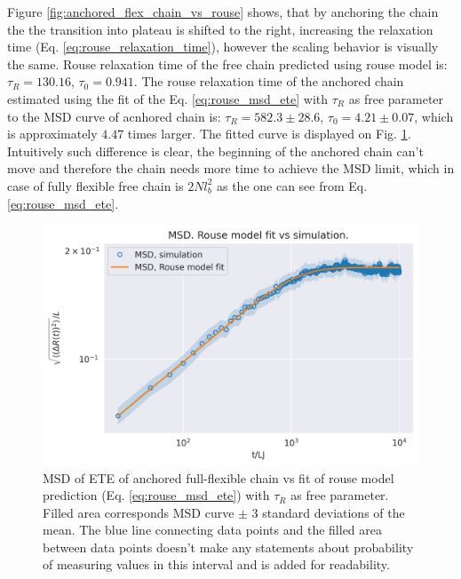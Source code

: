 \documentclass[
    paper=A4,pagesize=automedia,fontsize=12pt,
    BCOR=15mm,DIV=22,
    twoside,headinclude,footinclude=false,
    ngerman,fleqn,             %
    bibliography=totocnumbered,          %
    listof=totoc,                %
    listof=flat,                 %
    cleardoublepage=empty      %
    numbers=endperiod
]{scrartcl}
\begin{document}
Figure \ref{fig:anchored_flex_chain_vs_rouse} shows, that by anchoring the chain
the the transition into plateau is shifted to the right, increasing the 
relaxation time (Eq. \ref{eq:rouse_relaxation_time}), 
however the scaling behavior is visually the same. Rouse relaxation time
of the free chain predicted using rouse model is: $\tau_R=130.16$, $\tau_0=0.941$. 
The rouse relaxation time of the anchored chain estimated 
using the fit of the Eq. \ref{eq:rouse_msd_ete} with $\tau_R$ as free parameter
to the MSD curve of acnhored chain is: 
$\tau_R=582.3 \pm 28.6$, $\tau_0=4.21 \pm 0.07$, which is approximately $4.47$ times
larger. The fitted curve is displayed on Fig.
\ref{fig:anchored_flex_chain_vs_rouse_fitted}.
Intuitively such difference is clear, the beginning of the anchored chain
can't move and therefore the chain needs more time to achieve the MSD limit, which
in case of fully flexible free chain is $2Nl_b^2$ as the one can see from Eq. \ref{eq:rouse_msd_ete}. 


\begin{figure}[h]
    \begin{center}
      \includegraphics[width=\columnwidth,trim={0cm 0cm 0cm 0.8cm},clip]{3-exp-free-param-log.png}
      \caption{\label{fig:anchored_flex_chain_vs_rouse_fitted}
      MSD of ETE of anchored full-flexible chain vs fit of rouse model prediction 
      (Eq. \ref{eq:rouse_msd_ete}) with $\tau_R$ as free parameter.
      Filled area corresponds MSD curve $\pm$ 3 standard deviations of the mean. The
      blue line connecting data points and the filled area between data points doesn't make
      any statements about probability of measuring values in this interval and is
      added for readability.
      }
    \end{center}
\end{figure}
\end{document}
